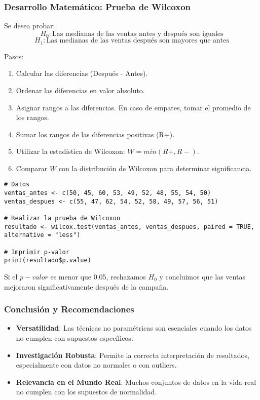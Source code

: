 \documentclass[aspectratio=169]{beamer}
\begin{document}
\begin{frame}
\frametitle{Desarrollo Matemático: Prueba de Wilcoxon}
Se desea probar:
\[ H_0: \text{Las medianas de las ventas antes y después son iguales} \]
\[ H_1: \text{Las medianas de las ventas después son mayores que antes} \]

Pasos:
\begin{enumerate}
\item Calcular las diferencias (Después - Antes).
\item Ordenar las diferencias en valor absoluto.
\item Asignar rangos a las diferencias. En caso de empates, tomar el promedio de los rangos.
\item Sumar los rangos de las diferencias positivas (R+).
\item Utilizar la estadística de Wilcoxon: \( W = min(R+, R-) \).
\item Comparar \( W \) con la distribución de Wilcoxon para determinar significancia.
\end{enumerate}
\end{frame}

\begin{frame}[fragile]
\begin{verbatim}
# Datos
ventas_antes <- c(50, 45, 60, 53, 49, 52, 48, 55, 54, 50)
ventas_despues <- c(55, 47, 62, 54, 52, 58, 49, 57, 56, 51)

# Realizar la prueba de Wilcoxon
resultado <- wilcox.test(ventas_antes, ventas_despues, paired = TRUE, alternative = "less")

# Imprimir p-valor
print(resultado$p.value)
\end{verbatim}
Si el \( p-valor \) es menor que 0.05, rechazamos \( H_0 \) y concluimos que las ventas mejoraron significativamente después de la campaña.
\end{frame}




\begin{frame}
\frametitle{Conclusión y Recomendaciones}
\begin{itemize}
\item \textbf{Versatilidad}: Las técnicas no paramétricas son esenciales cuando los datos no cumplen con supuestos específicos.
\item \textbf{Investigación Robusta}: Permite la correcta interpretación de resultados, especialmente con datos no normales o con outliers.
\item \textbf{Relevancia en el Mundo Real}: Muchos conjuntos de datos en la vida real no cumplen con los supuestos de normalidad.
\end{itemize}
\end{frame}
\end{document}
